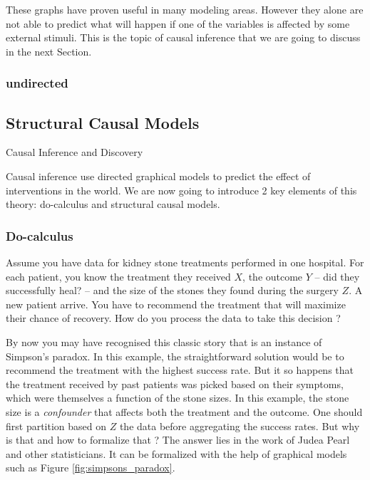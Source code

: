 These graphs have proven useful in many modeling areas. However they alone are not able to predict what will happen if one of the variables is affected by some external stimuli. This is the topic of causal inference that we are going to discuss in the next Section.


\subsubsection{undirected}
\subsection{Structural Causal Models}
{Causal Inference and Discovery}
\label{sec:causal_inference}

Causal inference use directed graphical models to predict the effect of interventions in the world. We are now going to introduce 2 key elements of this theory: do-calculus and structural causal models.

\subsubsection{Do-calculus}
Assume you have data for kidney stone treatments performed in one hospital. For each patient, you know the treatment they received $X$, the outcome $Y$ -- did they successfully heal? -- and the size of the stones they found during the surgery $Z$. A new patient arrive. You have to recommend the treatment that will maximize their chance of recovery.  How do you process the data to take this decision ?

By now you may have recognised this classic story that is an instance of Simpson's paradox. In this example, the straightforward solution would be to recommend the treatment with the highest success rate. But it so happens that the treatment received by past patients was picked based on their symptoms, which were themselves a function of the stone sizes. In this example, the stone size is a \textit{confounder} that affects both the treatment and the outcome. One should first partition based on $Z$ the data before aggregating the success rates. But why is that and how to formalize that ? The answer lies in the work of Judea Pearl \citep{pearl2009causality} and other statisticians. It can be formalized with the help of graphical models such as Figure \ref{fig:simpsons_paradox}.


